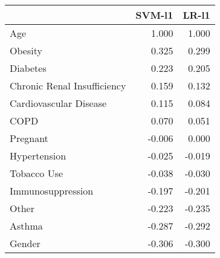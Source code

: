 \begin{tabular}{lrr}
\toprule
{} &  SVM-l1 &  LR-l1 \\
\midrule
Age                         &   1.000 &  1.000 \\
Obesity                     &   0.325 &  0.299 \\
Diabetes                    &   0.223 &  0.205 \\
Chronic Renal Insufficiency &   0.159 &  0.132 \\
Cardiovascular Disease      &   0.115 &  0.084 \\
COPD                        &   0.070 &  0.051 \\
Pregnant                    &  -0.006 &  0.000 \\
Hypertension                &  -0.025 & -0.019 \\
Tobacco Use                 &  -0.038 & -0.030 \\
Immunosuppression           &  -0.197 & -0.201 \\
Other                       &  -0.223 & -0.235 \\
Asthma                      &  -0.287 & -0.292 \\
Gender                      &  -0.306 & -0.300 \\
\bottomrule
\end{tabular}
